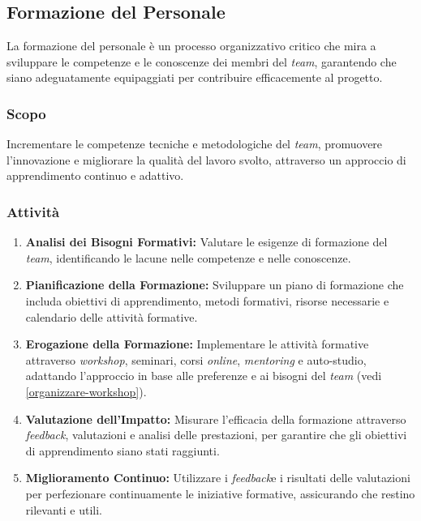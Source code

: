 \subsection{Formazione del Personale}

La formazione del personale è un processo organizzativo critico che mira a
sviluppare le competenze e le conoscenze dei membri del \textit{team}, garantendo che
siano adeguatamente equipaggiati per contribuire efficacemente al progetto.

\subsubsection{Scopo}
Incrementare le competenze tecniche e metodologiche del \textit{team}, promuovere
l'innovazione e migliorare la qualità del lavoro svolto, attraverso un approccio
di apprendimento continuo e adattivo.

\subsubsection{Attività}
\begin{enumerate}
	\item \textbf{Analisi dei Bisogni Formativi:} Valutare le esigenze di
	      formazione del \textit{team}, identificando le lacune nelle competenze e nelle
	      conoscenze.
	\item \textbf{Pianificazione della Formazione:} Sviluppare un piano di
	      formazione che includa obiettivi di apprendimento, metodi formativi,
	      risorse necessarie e calendario delle attività formative.
	\item \textbf{Erogazione della Formazione:} Implementare le attività
	      formative attraverso \textit{workshop}, seminari, corsi
	      \textit{online}, \textit{mentoring} e auto-studio, adattando
	      l'approccio in base alle preferenze e ai bisogni del \textit{team} (vedi
	      \cref{organizzare-workshop}).
	\item \textbf{Valutazione dell'Impatto:} Misurare l'efficacia della
	      formazione attraverso \textit{feedback}\g, valutazioni e analisi delle
	      prestazioni, per garantire che gli obiettivi di apprendimento siano
	      stati raggiunti.
	\item \textbf{Miglioramento Continuo:} Utilizzare i \textit{feedback}\g e i
	      risultati delle valutazioni per perfezionare continuamente le
	      iniziative formative, assicurando che restino rilevanti e utili.
\end{enumerate}

